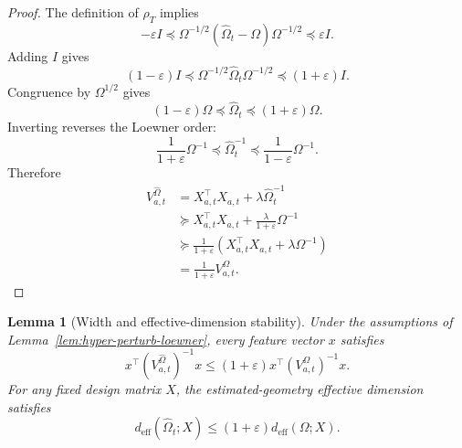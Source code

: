 \documentclass{article} %
\newtheorem{lemma}[theorem]{Lemma}
\begin{document}
\begin{proof}
The definition of \(\rho_T\) implies
\begin{equation}
\label{eq:hyper-perturb-proof-relative}
-\varepsilon I
\preceq
\Omega^{-1/2}
\left(
\widehat{\Omega}_t-\Omega
\right)
\Omega^{-1/2}
\preceq
\varepsilon I .
\end{equation}
Adding \(I\) gives
\begin{equation}
\label{eq:hyper-perturb-proof-addI}
(1-\varepsilon)I
\preceq
\Omega^{-1/2}\widehat{\Omega}_t\Omega^{-1/2}
\preceq
(1+\varepsilon)I .
\end{equation}
Congruence by \(\Omega^{1/2}\) gives
\begin{equation}
\label{eq:hyper-perturb-proof-omega}
(1-\varepsilon)\Omega
\preceq
\widehat{\Omega}_t
\preceq
(1+\varepsilon)\Omega .
\end{equation}
Inverting reverses the Loewner order:
\begin{equation}
\label{eq:hyper-perturb-proof-inv}
\frac{1}{1+\varepsilon}\Omega^{-1}
\preceq
\widehat{\Omega}_t^{-1}
\preceq
\frac{1}{1-\varepsilon}\Omega^{-1}.
\end{equation}
Therefore
\begin{align}
\label{eq:hyper-perturb-proof-V}
V_{a,t}^{\widehat{\Omega}}
&=
X_{a,t}^{\top}X_{a,t}
+
\lambda\widehat{\Omega}_t^{-1}
\\
&\succeq
X_{a,t}^{\top}X_{a,t}
+
\frac{\lambda}{1+\varepsilon}\Omega^{-1}
\\
&\succeq
\frac{1}{1+\varepsilon}
\left(
X_{a,t}^{\top}X_{a,t}
+
\lambda\Omega^{-1}
\right)
\\
&=
\frac{1}{1+\varepsilon}
V_{a,t}^{\Omega}.
\end{align}
\end{proof}

\begin{lemma}[Width and effective-dimension stability]
\label{lem:hyper-perturb-width}
Under the assumptions of Lemma~\ref{lem:hyper-perturb-loewner}, every feature vector \(x\) satisfies
\begin{equation}
\label{eq:hyper-perturb-width}
x^\top
\left(V_{a,t}^{\widehat{\Omega}}\right)^{-1}
x
\le
(1+\varepsilon)
x^\top
\left(V_{a,t}^{\Omega}\right)^{-1}
x .
\end{equation}
For any fixed design matrix \(X\), the estimated-geometry effective dimension satisfies
\begin{equation}
\label{eq:hyper-perturb-deff}
d_{\mathrm{eff}}(\widehat{\Omega}_t;X)
\le
(1+\varepsilon)
d_{\mathrm{eff}}(\Omega;X).
\end{equation}
\end{lemma}
\end{document}

